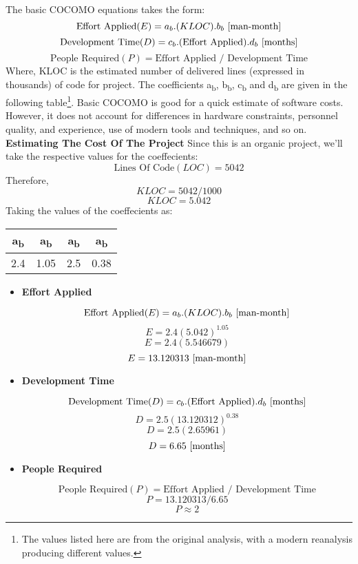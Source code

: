 	 \vs
	 The basic COCOMO equations takes the form:
	\[\textrm{Effort Applied}(E) = a_b.(KLOC).b_b  \textrm{\space [man-month]} \]
	\[\textrm{Development Time}(D) = c_b.(\textrm{Effort Applied}).d_b  \textrm{\space [months]} \]
	\[\textrm{People Required}(P) = \textrm{Effort Applied / Development Time}\]
	\vs
	Where, KLOC is the estimated number of delivered lines (expressed in thousands) of
	code for project. The coefficients a\textsubscript{b}, b\textsubscript{b}, c\textsubscript{b} and d\textsubscript{b} are given in the following table\footnote{The values listed here are from the original analysis, with a modern reanalysis producing different values.}.
	\vs
	Basic COCOMO is good for a quick estimate of software costs. However, it does not
	account for differences in hardware constraints, personnel quality, and experience, use of
	modern tools and techniques, and so on. 
	\vs
	\textbf{\large Estimating The Cost Of The Project}
	\vs
	Since this is an organic project, we’ll take the respective values for the coeffecients:
	\[\textrm{Lines Of Code}(LOC) = 5042\]
	Therefore, 
		\[KLOC = 5042 / 1000\]
		\[KLOC = 5.042      \]
	Taking the values of the coeffecients as:
	\vs
				\bgroup
	\def\arraystretch{2}%
	\begin{center}
		\begin{tabular}{|c|c|c|c|}
				\hline
				a\textsubscript{b} & a\textsubscript{b} &  a\textsubscript{b} & a\textsubscript{b} \\
				\hline
				2.4 & 1.05 & 2.5 & 0.38 \\
				\hline
		\end{tabular}
	\egroup
	\end{center}
	\vs
	\begin{itemize}
		\item \textbf{Effort Applied}
		
			\[\textrm{Effort Applied}(E) = a_b.(KLOC).b_b  \textrm{\space [man-month]} \]
			\[E = 2.4(5.042)^{1.05} \]
			\[E = 2.4(5.546679) \]
			\textbf{\[E = 13.120313 \textrm{\space [man-month]}\]}
			
		\item \textbf{Development Time}
			
	\[\textrm{Development Time}(D) = c_b.(\textrm{Effort Applied}).d_b  \textrm{\space [months]} \]
			\[D = 2.5(13.120312)^{0.38} \]
			\[D = 2.5(2.65961) \]
			\textbf{\[D = 6.65 \textrm{\space [months]}\]}
			
					\item \textbf{People Required}
			
	\[\textrm{People Required}(P) = \textrm{Effort Applied / Development Time}\]
			\[P = 13.120313 / 6.65 \]
			\[P \approx 2\]
	\end{itemize}